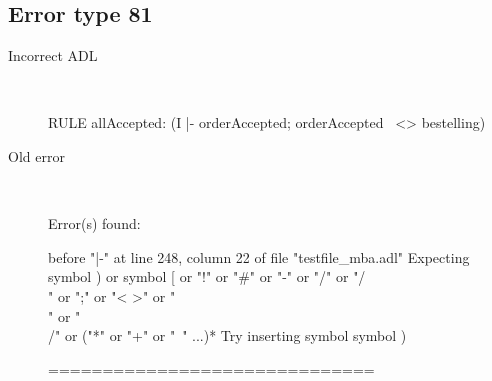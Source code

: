 \hrulefill

\subsection{Error type 81}
  \begin{description}
  \item[Incorrect ADL]~\\
\begin{adl}
RULE allAccepted: (I |- orderAccepted; orderAccepted~ <> bestelling) \end{adl}
  \item[Old error]~\\
\begin{haskell}
Error(s) found:

before "|-" at line 248, column 22 of file "testfile_mba.adl"
Expecting symbol ) or symbol [ or "!" or "#" or "-" or "/" or "/\\" or ";" or "<
>" or "\\" or "\\/" or ("*" or "+" or "~" ...)*
Try inserting symbol symbol )

==============================


\end{haskell}
\end{description}
